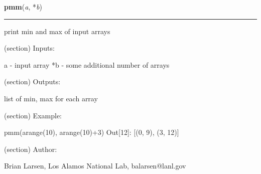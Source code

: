     \label{spacepy:toolbox:pmm}

    \vspace{0.5ex}

\hspace{.8\funcindent}\begin{boxedminipage}{\funcwidth}

    \raggedright \textbf{pmm}(\textit{a}, *\textit{b})

    \vspace{-1.5ex}

    \rule{\textwidth}{0.5\fboxrule}
\setlength{\parskip}{2ex}
    print min and max of input arrays

    (section) Inputs:

      a - input array *b - some additional number of arrays

    (section) Outputs:

      list of min, max for each array

    (section) Example:

      pmm(arange(10), arange(10)+3) Out[12]: [(0, 9), (3, 12)]

    (section) Author:

      Brian Larsen, Los Alamos National Lab, balarsen@lanl.gov

\setlength{\parskip}{1ex}
    \end{boxedminipage}

    \label{spacepy:toolbox:timestamp}

    \vspace{0.5ex}

